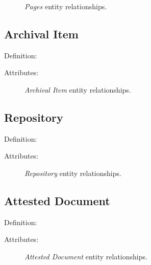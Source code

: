 \begin{figure}[ht]
    \begin{center}
        
    \end{center}
\label{fig:PagesER}
\caption{\textit{Pages} entity relationships.}
\end{figure}


\subsection{Archival Item}

Definition: 

\vspace{1em}
\noindent Attributes:

\begin{figure}[ht]
    \begin{center}
        
    \end{center}
\label{fig:ArchivalER}
\caption{\textit{Archival Item} entity relationships.}
\end{figure}


\subsection{Repository}

Definition: 

\vspace{1em}
\noindent Attributes:

\begin{figure}[ht]
    \begin{center}
        
    \end{center}
\label{fig:RepositoryER}
\caption{\textit{Repository} entity relationships.}
\end{figure}


\subsection{Attested Document}

Definition: 

\vspace{1em}
\noindent Attributes:

\begin{figure}[ht]
    \begin{center}
        
    \end{center}
\label{fig:AttestedDocumentER}
\caption{\textit{Attested Document} entity relationships.}
\end{figure}

